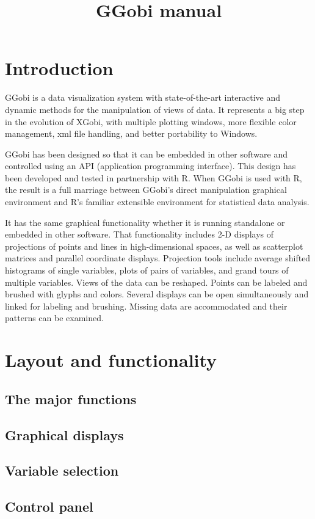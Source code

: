 \documentclass{article}
\title {GGobi manual}
\begin{document}
\section{Introduction}

GGobi is a data visualization system with state-of-the-art
interactive and dynamic methods for the manipulation of views of
data.  It represents a big step in the evolution of XGobi, with
multiple plotting windows, more flexible color management, xml file
handling, and better portability to Windows. 

GGobi has been designed so that it can be embedded in
other software and controlled using an API (application programming
interface).  This design has been developed and tested in partnership
with R.  When GGobi is used with R, the result is a full marriage
between GGobi's direct manipulation graphical environment and R's
familiar extensible environment for statistical data analysis.

It has the same graphical functionality whether it is running
standalone or embedded in other software.  That functionality
includes 2-D displays of projections of points and lines in
high-dimensional spaces, as well as scatterplot matrices and parallel
coordinate displays.  Projection tools include average shifted
histograms of single variables, plots of pairs of variables, and
grand tours of multiple variables.  Views of the data can be
reshaped.  Points can be labeled and brushed with glyphs and colors.
Several displays can be open simultaneously and linked for labeling
and brushing.  Missing data are accommodated and their patterns can
be examined.

\section{Layout and functionality}
\subsection{The major functions}
\subsection{Graphical displays}
\subsection{Variable selection}
\subsection{Control panel}
\end{document}
